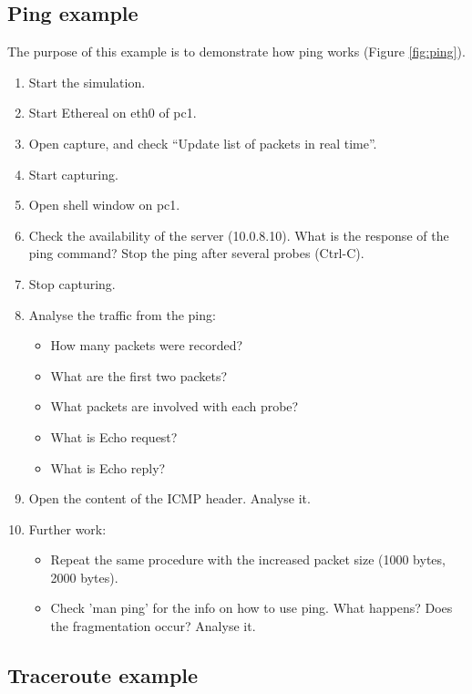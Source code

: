 \subsection{Ping example}

The purpose of this example is to demonstrate how ping works (Figure
\ref{fig:ping}).


\begin{enumerate}
\item	Start the simulation.
\item	Start Ethereal on eth0 of pc1. 
\item	Open capture, and check ``Update list of packets in real time''.
\item	Start capturing.
\item	Open shell window on pc1.
\item	Check the availability of the server (10.0.8.10). What is the response
of the ping command? Stop the ping after several probes (Ctrl-C). 
\item	Stop capturing.
\item	Analyse the traffic from the ping:
\begin{itemize}
\item	How many packets were recorded?
\item	What are the first two packets?
\item	What packets are involved with each probe?
\item	What is Echo request?
\item	 What is Echo reply?
\end{itemize}
\item	Open the content of the ICMP header. Analyse it.
\item	Further work:
\begin{itemize}
\item	Repeat the same procedure with the increased packet size (1000 bytes,
2000 bytes). 
\item	Check 'man ping' for the info on how to use ping.  What happens? Does
the fragmentation occur? Analyse it.
\end{itemize}
\end{enumerate}

\subsection{Traceroute example}

